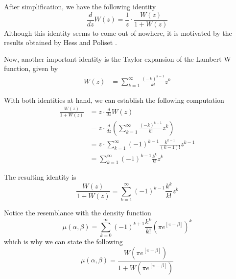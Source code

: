 \documentclass{article}
\newcommand{\ppar}[1]{\left( #1 \right)}
\newcommand{\spar}[1]{\left[ #1 \right]}
\begin{document}
After simplification, we have the following identity
\begin{equation}
    \frac{d}{dz} W(z) 
    =
    \frac{1}{z} \cdot \frac{W(z)}{1+W(z)}
\end{equation}
Although this identity seems to come out of nowhere, it is motivated by the results obtained by Hess and Poliset \cite{hess2023}.

Now, another important identity is the Taylor expansion of the Lambert W function, given by
\begin{align}
    W(z) 
    &=
    \sum_{k=1}^\infty 
    \frac{(-k)^{k-1}}{k!} z^k
\end{align}

With both identities at hand, we can establish the following computation
\begin{align*}
    \frac{W(z)}{1+W(z)}
    &=
    z \cdot \frac{d}{dz} W(z)
    \\
    &=
    z \cdot \frac{d}{dz} \ppar{\sum_{k=1}^\infty 
    \frac{(-k)^{k-1}}{k!} z^k}
    \\
    &=
    z \cdot {\sum_{k=1}^\infty 
    \ppar{-1}^{k-1}
    \frac{k^{k-1}}{\ppar{k-1}!} z^{k-1}}
    \\
    &=
    {\sum_{k=1}^\infty 
    \ppar{-1}^{k-1}
    \frac{k^{k}}{{k}!} z^{k}}
\end{align*}

The resulting identity is
\begin{equation}
    \frac{W(z)}{1+W(z)}
    =
    {\sum_{k=1}^\infty 
    \ppar{-1}^{k-1}
    \frac{k^{k}}{{k}!} z^{k}}
\end{equation}

Notice the resemblance with the density function
\begin{equation}
    \mu(\alpha, \beta) =
    \sum_{k=0}^{\infty}
    (-1)^{k+1} \frac{k^k}{k!} 
    \ppar{\pi e^{\spar{\pi-\beta}} }^k
\end{equation}
which is why we can state the following
\begin{equation}
    \mu(\alpha, \beta) =
    \frac{W\ppar{\pi e^{\spar{\pi-\beta}}}}{1+W\ppar{\pi e^{\spar{\pi-\beta}}}}
\end{equation}



\end{document}
